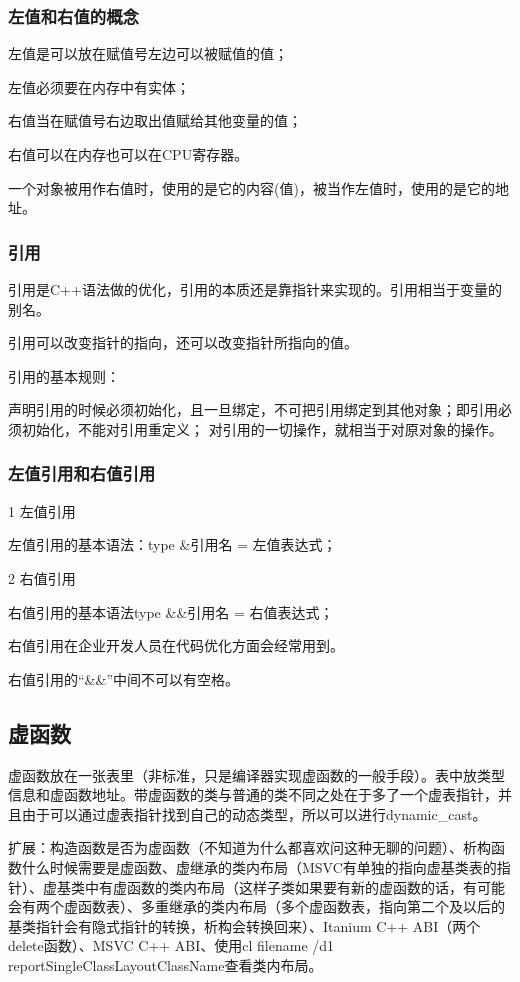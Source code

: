 \subsubsection{左值和右值的概念}

左值是可以放在赋值号左边可以被赋值的值；

左值必须要在内存中有实体；

右值当在赋值号右边取出值赋给其他变量的值；

右值可以在内存也可以在CPU寄存器。

一个对象被用作右值时，使用的是它的内容(值)，被当作左值时，使用的是它的地址。

\subsubsection{引用}

引用是C++语法做的优化，引用的本质还是靠指针来实现的。引用相当于变量的别名。

引用可以改变指针的指向，还可以改变指针所指向的值。

引用的基本规则：

声明引用的时候必须初始化，且一旦绑定，不可把引用绑定到其他对象；即引用必须初始化，不能对引用重定义；
对引用的一切操作，就相当于对原对象的操作。

\subsubsection{左值引用和右值引用}

1 左值引用

左值引用的基本语法：type \&引用名 = 左值表达式；

2 右值引用

右值引用的基本语法type \&\&引用名 = 右值表达式；

右值引用在企业开发人员在代码优化方面会经常用到。

右值引用的“\&\&”中间不可以有空格。

\subsection{虚函数}

虚函数放在一张表里（非标准，只是编译器实现虚函数的一般手段）。表中放类型信息和虚函数地址。带虚函数的类与普通的类不同之处在于多了一个虚表指针，并且由于可以通过虚表指针找到自己的动态类型，所以可以进行dynamic\_cast。

扩展：构造函数是否为虚函数（不知道为什么都喜欢问这种无聊的问题）、析构函数什么时候需要是虚函数、虚继承的类内布局（MSVC有单独的指向虚基类表的指针）、虚基类中有虚函数的类内布局（这样子类如果要有新的虚函数的话，有可能会有两个虚函数表）、多重继承的类内布局（多个虚函数表，指向第二个及以后的基类指针会有隐式指针的转换，析构会转换回来）、Itanium C++ ABI（两个delete函数）、MSVC C++ ABI、使用cl filename /d1 reportSingleClassLayoutClassName查看类内布局。

